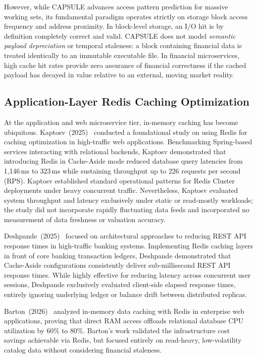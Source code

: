 \documentclass[11pt,a4paper]{article}
\begin{document}
However, while CAPSULE advances access pattern prediction for massive working sets, its fundamental paradigm operates strictly on storage block access frequency and address proximity. In block-level storage, an I/O hit is by definition completely correct and valid. CAPSULE does not model \textit{semantic payload depreciation} or temporal staleness: a block containing financial data is treated identically to an immutable executable file. In financial microservices, high cache hit rates provide zero assurance of financial correctness if the cached payload has decayed in value relative to an external, moving market reality.

\subsection{Application-Layer Redis Caching Optimization}

At the application and web microservice tier, in-memory caching has become ubiquitous. Kaptosv~(2025)~\cite{kaptosv2025} conducted a foundational study on using Redis for caching optimization in high-traffic web applications. Benchmarking Spring-based services interacting with relational backends, Kaptosv demonstrated that introducing Redis in Cache-Aside mode reduced database query latencies from 1{,}146\,ms to 323\,ms while sustaining throughput up to 226 requests per second (RPS). Kaptosv established standard operational patterns for Redis Cluster deployments under heavy concurrent traffic. Nevertheless, Kaptosv evaluated system throughput and latency exclusively under static or read-mostly workloads; the study did not incorporate rapidly fluctuating data feeds and incorporated no measurement of data freshness or valuation accuracy.

Deshpande~(2025)~\cite{deshpande2025} focused on architectural approaches to reducing REST API response times in high-traffic banking systems. Implementing Redis caching layers in front of core banking transaction ledgers, Deshpande demonstrated that Cache-Aside configurations consistently deliver sub-millisecond REST API response times. While highly effective for reducing latency across concurrent user sessions, Deshpande exclusively evaluated client-side elapsed response times, entirely ignoring underlying ledger or balance drift between distributed replicas.

Barton~(2026)~\cite{barton2026} analyzed in-memory data caching with Redis in enterprise web applications, proving that direct RAM access offloads relational database CPU utilization by 60\% to 80\%. Barton's work validated the infrastructure cost savings achievable via Redis, but focused entirely on read-heavy, low-volatility catalog data without considering financial staleness.
\end{document}
